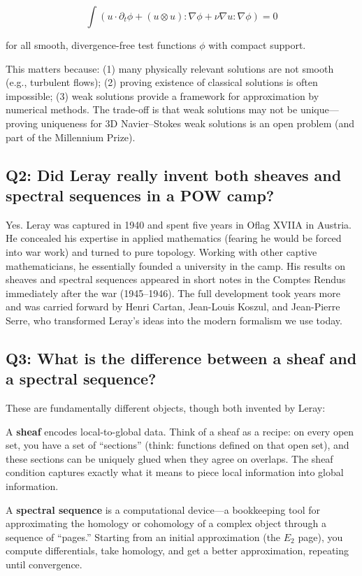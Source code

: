 \[
\int (u \cdot \partial_t \phi + (u \otimes u):\nabla\phi + \nu \nabla u:\nabla\phi) = 0
\]

for all smooth, divergence-free test functions $\phi$ with compact support.

This matters because: (1) many physically relevant solutions are not smooth (e.g., turbulent flows); (2) proving existence of classical solutions is often impossible; (3) weak solutions provide a framework for approximation by numerical methods. The trade-off is that weak solutions may not be unique---proving uniqueness for 3D Navier--Stokes weak solutions is an open problem (and part of the Millennium Prize).

\subsection*{Q2: Did Leray really invent both sheaves and spectral sequences in a POW camp?}

Yes. Leray was captured in 1940 and spent five years in Oflag XVIIA in Austria. He concealed his expertise in applied mathematics (fearing he would be forced into war work) and turned to pure topology. Working with other captive mathematicians, he essentially founded a university in the camp. His results on sheaves and spectral sequences appeared in short notes in the Comptes Rendus immediately after the war (1945--1946). The full development took years more and was carried forward by Henri Cartan, Jean-Louis Koszul, and Jean-Pierre Serre, who transformed Leray's ideas into the modern formalism we use today.

\subsection*{Q3: What is the difference between a sheaf and a spectral sequence?}

These are fundamentally different objects, though both invented by Leray:

A \textbf{sheaf} encodes local-to-global data. Think of a sheaf as a recipe: on every open set, you have a set of ``sections'' (think: functions defined on that open set), and these sections can be uniquely glued when they agree on overlaps. The sheaf condition captures exactly what it means to piece local information into global information.

A \textbf{spectral sequence} is a computational device---a bookkeeping tool for approximating the homology or cohomology of a complex object through a sequence of ``pages.'' Starting from an initial approximation (the $E_2$ page), you compute differentials, take homology, and get a better approximation, repeating until convergence.

